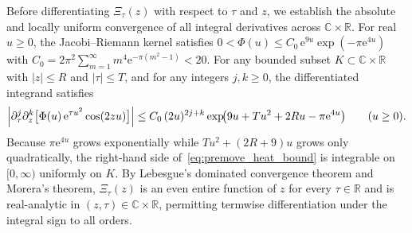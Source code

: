 \documentclass[11pt,reqno]{amsart}
\theoremstyle{definition}
\theoremstyle{remark}
\numberwithin{equation}{section}
\newcommand{\R}{\mathbb{R}}
\newcommand{\C}{\mathbb{C}}
\newcommand{\ee}{\mathrm{e}}
\begin{document}
Before differentiating $\Xi_\tau(z)$ with respect to $\tau$ and $z$, we establish the absolute and locally uniform convergence of all integral derivatives across $\C \times \R$. For real $u \ge 0$, the Jacobi--Riemann kernel satisfies $0 < \Phi(u) \le C_0\,\ee^{9u}\exp(-\pi\ee^{4u})$ with $C_0 = 2\pi^2\sum_{m=1}^\infty m^4\ee^{-\pi(m^2-1)} < 20$. For any bounded subset $K \subset \C \times \R$ with $|z| \le R$ and $|\tau| \le T$, and for any integers $j, k \ge 0$, the differentiated integrand satisfies
\begin{equation}\label{eq:premove_heat_bound}
\Bigl|\partial_\tau^j \partial_z^k\bigl[\Phi(u)\,\ee^{\tau u^2}\cos(2zu)\bigr]\Bigr| \le C_0\,(2u)^{2j+k}\exp\!\bigl(9u + Tu^2 + 2Ru - \pi\ee^{4u}\bigr) \qquad (u \ge 0).
\end{equation}
Because $\pi\ee^{4u}$ grows exponentially while $Tu^2 + (2R+9)u$ grows only quadratically, the right-hand side of~\eqref{eq:premove_heat_bound} is integrable on $[0, \infty)$ uniformly on $K$. By Lebesgue's dominated convergence theorem and Morera's theorem, $\Xi_\tau(z)$ is an even entire function of $z$ for every $\tau \in \R$ and is real-analytic in $(z, \tau) \in \C \times \R$, permitting termwise differentiation under the integral sign to all orders.
\end{document}
